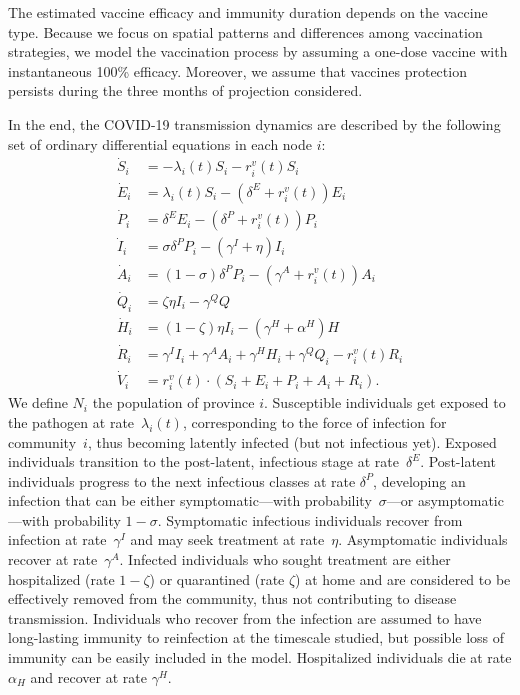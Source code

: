The estimated vaccine efficacy and immunity duration depends on the vaccine type. Because we focus on spatial patterns and differences among vaccination strategies, we model the vaccination process by assuming a one-dose vaccine with instantaneous 100\% efficacy. %
Moreover, we assume that vaccines protection persists during the three months of projection considered.

In the end, the COVID-19 transmission dynamics are described by the following set of ordinary differential equations in each node $i$: 
\begin{equation}\label{eq:sepiar}
\begin{split}
    \dot{S}_i &= - \lambda_i(t) S_i - r^v_i(t) S_i \\
    \dot{E}_i &= \lambda_i(t) S_i -  (\delta^E + r^v_i(t)) E_i \\
    \dot{P}_i &= \delta^E E_i -  (\delta^P+r^v_i(t))  P_i \\
    \dot{I}_i &= \sigma \delta^P P_i - (\gamma^I + \eta)  I_i \\
    \dot{A}_i &= (1 - \sigma) \delta^P P_i - (\gamma^A+ r^v_i(t)) A_i \\
    \dot{Q}_i &= \zeta \eta I_i - \gamma^Q Q \\
    \dot{H}_i &= (1-\zeta) \eta I_i - (\gamma^H + \alpha^H)H \\
    \dot{R}_i &= \gamma^I I_i + \gamma^A A_i + \gamma^H H_i + \gamma^Q Q_i - r^v_i(t) R_i\\
    \dot{V}_i &= r^v_i(t) \cdot (S_i + E_i + P_i + A_i + R_i).
\end{split}
\end{equation}
We define $N_i$ the population of province $i$. Susceptible individuals get exposed to the pathogen at rate~$\lambda_i(t)$, corresponding to the force of infection for community~$i$, thus becoming latently infected (but not infectious yet). Exposed individuals transition to the post-latent, infectious stage at rate~$\delta^E$. Post-latent individuals progress to the next infectious classes at rate $\delta^P$, developing an infection that can be either symptomatic---with probability~$\sigma$---or asymptomatic---with probability $1 - \sigma$. Symptomatic infectious individuals recover from infection at rate~$\gamma^I$ and may seek treatment at rate~$\eta$. Asymptomatic individuals recover at rate~$\gamma^A$.  Infected individuals who sought treatment are either hospitalized (rate $1-\zeta$) or quarantined (rate $\zeta$) at home and are considered to be effectively removed from the community, thus not contributing to disease transmission. Individuals who recover from the infection are assumed to have long-lasting immunity to reinfection at the timescale studied, but possible loss of immunity can be easily included in the model. Hospitalized individuals die at rate $\alpha_H$ and recover at rate $\gamma^H$.

